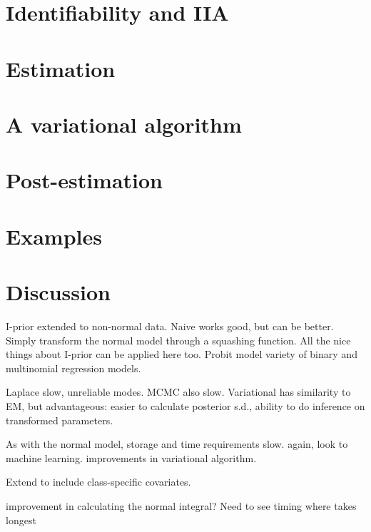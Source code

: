 \documentclass[a4paper,showframe,11pt]{report}
\begin{document}
\section{Identifiability and IIA}\label{sec:iia}
%

\section{Estimation}


\section{A variational algorithm}\label{sec:iprobitvar}


\section{Post-estimation}
%

\section{Examples}

\section{Discussion}

I-prior extended to non-normal data. 
Naive works good, but can be better.
Simply transform the normal model through a squashing function.
All the nice things about I-prior can be applied here too.
Probit model variety of binary and multinomial regression models.

Laplace slow, unreliable modes. MCMC also slow. Variational has similarity to EM, but advantageous: easier to calculate posterior s.d., ability to do inference on transformed parameters.

As with the normal model, storage and time requirements slow.
again, look to machine learning.
improvements in variational algorithm.

Extend to include class-specific covariates.

improvement in calculating the normal integral?
Need to see timing where takes longest
\end{document}
